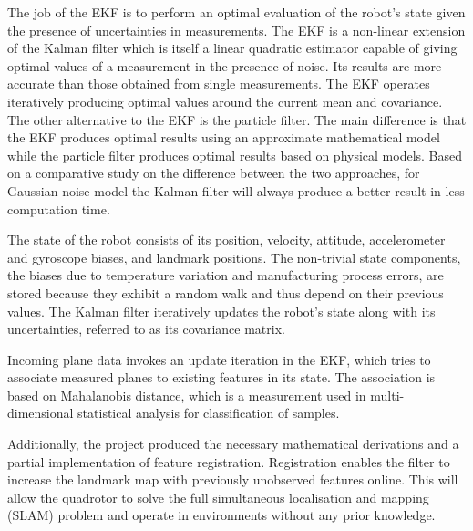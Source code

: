 \documentclass[]{article}
\begin{document}
{The job of the EKF is to perform an optimal evaluation of the robot's state given the presence of uncertainties in measurements. The EKF is a non-linear extension of the Kalman filter which is itself a linear quadratic estimator capable of giving optimal values of a measurement in the presence of noise. Its results are more accurate than those obtained from single measurements. The EKF operates iteratively producing optimal values around the current mean and covariance. The other alternative to the EKF is the particle filter. The main difference is that the EKF produces optimal results using an approximate mathematical model while the particle filter produces optimal results based on physical models.
Based on a comparative study \cite{CompareFilters} on the difference between the two approaches, for Gaussian noise model the Kalman filter will always produce a better result in less computation time.

The state of the robot consists of its position, velocity, attitude, accelerometer and gyroscope biases, and landmark positions. The non-trivial state components, the biases due to temperature variation and manufacturing process errors, are stored because they exhibit a random walk and thus depend on their previous values. The Kalman filter iteratively updates the robot's state along with its uncertainties, referred to as its covariance matrix.



Incoming plane data invokes an update iteration in the EKF, which tries to associate measured planes to existing features in its state. The association is based on Mahalanobis distance, which is a measurement used in multi-dimensional statistical analysis for classification of samples.

Additionally, the project produced the necessary mathematical derivations and a partial implementation of feature registration. Registration enables the filter to increase the landmark map with previously unobserved features online. This will allow the quadrotor to solve the full simultaneous localisation and mapping (SLAM) problem and operate in environments without any prior knowledge.

}
\end{document}
